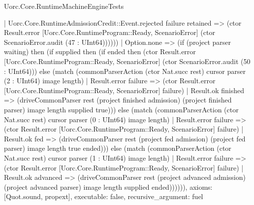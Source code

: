 \begin{lexlean}{Uorc.Core.RuntimeMachineEngineTests}
\begin{semanticmodule}
{              | Uorc.Core.RuntimeAdmissionCredit::Event.rejected failure retained => (ctor Result.error [Uorc.Core.RuntimeProgram::Ready, ScenarioError] (ctor ScenarioError.audit (47 : UInt64))))))
        | Option.none => (if (project parser waiting) then (if supplied then (if ended then (ctor Result.error [Uorc.Core.RuntimeProgram::Ready, ScenarioError] (ctor ScenarioError.audit (50 : UInt64))) else (match (commonParserAction (ctor Nat.succ rest) cursor parser (2 : UInt64) image length)
          | Result.error failure => (ctor Result.error [Uorc.Core.RuntimeProgram::Ready, ScenarioError] failure)
          | Result.ok finished => (driveCommonParser rest (project finished admission) (project finished parser) image length supplied true))) else (match (commonParserAction (ctor Nat.succ rest) cursor parser (0 : UInt64) image length)
          | Result.error failure => (ctor Result.error [Uorc.Core.RuntimeProgram::Ready, ScenarioError] failure)
          | Result.ok fed => (driveCommonParser rest (project fed admission) (project fed parser) image length true ended))) else (match (commonParserAction (ctor Nat.succ rest) cursor parser (1 : UInt64) image length)
          | Result.error failure => (ctor Result.error [Uorc.Core.RuntimeProgram::Ready, ScenarioError] failure)
          | Result.ok advanced => (driveCommonParser rest (project advanced admission) (project advanced parser) image length supplied ended)))))),
  axioms: [Quot.sound, propext],
  executable: false,
  recursive_argument: fuel
}


\end{semanticmodule}
\end{lexlean}
